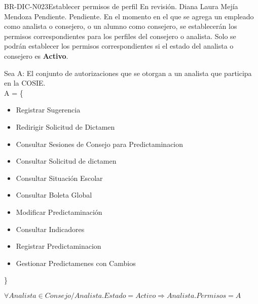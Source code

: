\begin{BusinessRule}{BR-DIC-N023}{Establecer permisos de perfil}
	{\bcCondition}  %
	{\btEnabler}    %
	{\blControlling}    %
	\BRItem[Estado] En revisión.
	 Diana Laura Mejía Mendoza
	 Pendiente.
	 Pendiente.
	\BRItem[Descripción] En el momento en el que se agrega un empleado como analista o consejero, o un alumno como consejero, se establecerán los permisos correspondientes para los perfiles del consejero o analista.
	Solo se podrán establecer los permisos correspondientes si el estado del analista o consejero es \textbf{Activo}.
	
	\BRItem[Sentencia] \cdtEmpty
	Sea A: El conjunto de autorizaciones que se otorgan a un analista que participa en la COSIE. \\ 
	 A = \{ \begin{itemize} \item Registrar Sugerencia 
     \item Redirigir Solicitud de Dictamen
	 \item Consultar Sesiones de Consejo para Predictaminacion
	 \item Consultar Solicitud de dictamen
	 \item Consultar Situación Escolar
	 \item Consultar Boleta Global
	 \item Modificar Predictaminación
	 \item Consultar Indicadores
	 \item Registrar Predictaminacion
	 \item Gestionar Predictamenes con Cambios  \end{itemize}\}
	\begin{center}
	$ \forall Analista \in Consejo / Analista.Estado = Activo \Rightarrow Analista.Permisos = A$
	\end{center}
	

\end{BusinessRule}
